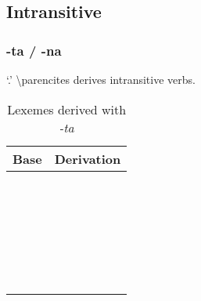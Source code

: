 \documentclass{memoir}
\begin{document}
\subsection{Intransitive}

\subsubsection{\texorpdfstring{-ta / -na \label{sec:tavbz}}{-ta / -na }}

 `.' \textbackslash parencites derives
intransitive verbs.

\begin{table}
\caption{Lexemes derived with \emph{-ta}}
\label{tab:tavbz}
\centering
\begin{tabular}{ll}
\toprule
Base & Derivation \\
\midrule
     &            \\
     &            \\
     &            \\
     &            \\
     &            \\
     &            \\
     &            \\
     &            \\
     &            \\
     &            \\
     &            \\
     &            \\
     &            \\
     &            \\
     &            \\
     &            \\
     &            \\
     &            \\
     &            \\
     &            \\
     &            \\
     &            \\
     &            \\
     &            \\
     &            \\
     &            \\
\bottomrule
\end{tabular}

\end{table}
\end{document}
